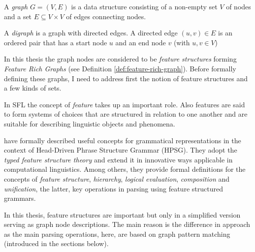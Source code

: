     \begin{definition}[Graph]\label{def:graph}
    	A \textit{graph} $G=(V,E)$ is a data structure consisting of a non-empty set $V$ of nodes and a set $E\subseteq V \times V$ of edges connecting nodes.
    \end{definition}
    
    \begin{definition}[Digraph]\label{def:digraph}
    	A \textit{digraph} is a graph with directed edges. A directed edge $(u,v)\in E$ is an ordered pair that has a start node $u$ and an end node $v$ (with $u, v \in V$)
    \end{definition}


    In this thesis the graph nodes are considered to be \textit{feature structures} forming \textit{Feature Rich Graphs} (see Definition \ref{def:feature-rich-graph}). Before formally defining these graphs, I need to address first the notion of feature structures and a few kinds of sets. 

    In SFL the concept of \textit{feature} takes up an important role. Also features are said to form systems of choices that are structured in relation to one another and are suitable for describing linguistic objects and phenomena.

    \citet{Pollard1987} have formally described useful concepts for grammatical representations in the context of Head-Driven Phrase Structure Grammar (HPSG). They adopt the \textit{typed feature structure theory} and extend it in innovative  ways applicable in computational linguistics. Among others, they provide formal definitions for the concepts of \textit{feature structure}, \textit{hierarchy}, \textit{logical evaluation}, \textit{composition} and \textit{unification}, the latter, key operations in parsing using feature structured grammars. 

    In this thesis, feature structures are important but only in a simplified version serving as graph node descriptions. The main reason is the difference in approach as the main parsing operations, here, are based on graph pattern matching (introduced in the sections below).

